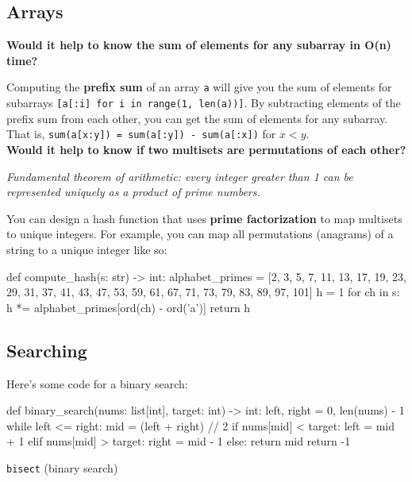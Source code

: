 \documentclass[12pt]{article}
\begin{document}
\subsection*{Arrays}

\begin{adjustwidth}{2em}{0pt}
\textbf{Would it help to know the sum of elements for any subarray in O(n) time?} \medskip

Computing the \textbf{prefix sum} of an array \texttt{a} will give you the sum of elements for subarrays \texttt{[a[:i] for i in range(1, len(a))]}. By subtracting elements of the prefix sum from each other, you can get the sum of elements for any subarray. That is, \texttt{sum(a[x:y]) = sum(a[:y]) - sum(a[:x])} for $x < y$. \\

\textbf{Would it help to know if two multisets are permutations of each other?} \medskip

\textit{Fundamental theorem of arithmetic: every integer greater than 1 can be represented uniquely as a product of prime numbers.} \medskip

You can design a hash function that uses \textbf{prime factorization} to map multisets to unique integers. For example, you can map all permutations (anagrams) of a string to a unique integer like so: \medskip

\begin{python}
def compute_hash(s: str) -> int:
    alphabet_primes = [2, 3, 5, 7, 11, 13, 17, 19, 23, 29,
                       31, 37, 41, 43, 47, 53, 59, 61, 67,
                       71, 73, 79, 83, 89, 97, 101]
    h = 1
    for ch in s:
        h *= alphabet_primes[ord(ch) - ord('a')]
    return h
\end{python}


\end{adjustwidth}

\subsection*{Searching}

\begin{adjustwidth}{2em}{0pt}
Here's some code for a binary search:
\begin{python}
def binary_search(nums: list[int], target: int) -> int:
    left, right = 0, len(nums) - 1
    while left <= right:
        mid = (left + right) // 2
        if nums[mid] < target:
            left = mid + 1
        elif nums[mid] > target:
            right = mid - 1
        else:
            return mid
    return -1
\end{python}

\texttt{bisect} (binary search)
\end{adjustwidth}
\end{document}

